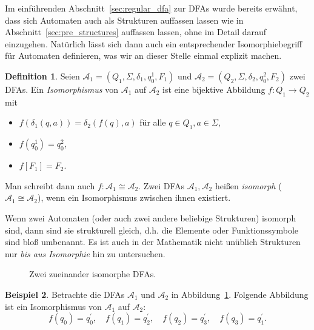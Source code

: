 \documentclass[11pt, a4paper]{article}
\theoremstyle{definition}
\newtheorem{definition}{Definition}[section]
\newtheorem{example}[definition]{Beispiel}
\theoremstyle{plain}
\numberwithin{equation}{section}
\begin{document}
Im einführenden Abschnitt~\ref{sec:regular_dfa} zur DFAs wurde bereits erwähnt, dass sich Automaten auch als Strukturen auffassen lassen wie in Abschnitt~\ref{sec:pre_structures} auffassen lassen, ohne im Detail darauf einzugehen. Natürlich lässt sich dann auch ein entsprechender Isomorphiebegriff für Automaten definieren, was wir an dieser Stelle einmal explizit machen.
\begin{definition}
	Seien $\mathcal{A}_1 = (Q_1, \Sigma, \delta_1, q_0^1, F_1)$ und $\mathcal{A}_2 = (Q_2, \Sigma, \delta_2, q_0^2, F_2)$ zwei DFAs. Ein \textit{Isomorphismus} von $\mathcal{A}_1$ auf $\mathcal{A}_2$ ist eine bijektive Abbildung $f\colon Q_1 \to Q_2$ mit
	\begin{itemize}
		\item $f(\delta_1(q, a)) = \delta_2(f(q), a)$ für alle $q \in Q_1, a \in \Sigma$,
		\item $f(q_0^1) = q_0^2$,
		\item $f[F_1] = F_2$.
	\end{itemize}
	Man schreibt dann auch $f\colon \mathcal{A}_1 \cong \mathcal{A}_2$. Zwei DFAs $\mathcal{A}_1, \mathcal{A}_2$ heißen \textit{isomorph} ($\mathcal{A}_1 \cong \mathcal{A}_2$), wenn ein Isomorphismus zwischen ihnen existiert.
\end{definition}
Wenn zwei Automaten (oder auch zwei andere beliebige Strukturen) isomorph sind, dann sind sie strukturell gleich, d.h. die Elemente oder Funktionssymbole sind bloß umbenannt. Es ist auch in der Mathematik nicht unüblich Strukturen nur \textit{bis aus Isomorphie} hin zu untersuchen.
\begin{figure}
	\centering
	\begin{subfigure}[b]{.49\textwidth}
		\centering
		
	\end{subfigure}
	\begin{subfigure}[b]{.49\textwidth}
		\centering
		
	\end{subfigure}
	\caption{Zwei zueinander isomorphe DFAs.}
	\label{fig:dfa_iso}
\end{figure}
\begin{example}
	Betrachte die DFAs $\mathcal{A}_1$ und $\mathcal{A}_2$ in Abbildung~\ref{fig:dfa_iso}. Folgende Abbildung ist ein Isomorphismus von $\mathcal{A}_1$ auf $\mathcal{A}_2$:
	$$
		f(q_0) = q_0^\prime, \quad f(q_1) = q_2^\prime, \quad f(q_2) = q_3^\prime, \quad f(q_3) = q_1^\prime.
	$$
\end{example}
\end{document}
